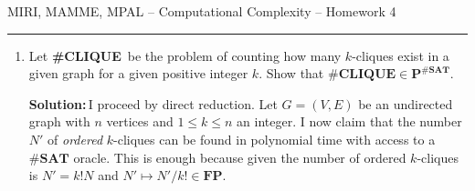 \documentclass{amsart}
\theoremstyle{plain}
\theoremstyle{definition}
\newcommand{\p}{\textbf{P}}
\newcommand{\fp}{\textbf{FP}}
\newcommand{\sharpclique}{\textbf{\#CLIQUE}}
\newcommand{\sharpsat}{\textbf{\#SAT}}
\newcommand{\sol}{\textbf{Solution:\,}}
\begin{document}
    {\Large MIRI, MAMME, MPAL -- Computational Complexity -- Homework 4}

    \vspace{0.5cm}

    \hrule

    \vspace{0.5cm}

    \begin{enumerate}[label=\textbf{Exercise \arabic*:}, leftmargin=0cm, labelwidth=-0.2cm, align=left]

        \item Let \sharpclique\, be the problem of counting how many $k$-cliques exist in a given graph
        for a given positive integer $k$.
        Show that $\sharpclique \in \p^{\sharpsat}$.

           \sol I proceed by direct reduction.
            Let $G = (V, E)$ be an undirected graph with $n$ vertices
            and $1 \leq k \leq n$ an integer.
            I now claim that the number $N'$ of \emph{ordered}
            $k$-cliques can be found in polynomial time
            with access to a $\sharpsat$ oracle.
            This is enough because given the number
            of ordered $k$-cliques is $N' = k!N$ and
            $N' \mapsto N'/k! \in \fp$.


\end{enumerate}
\end{document}
